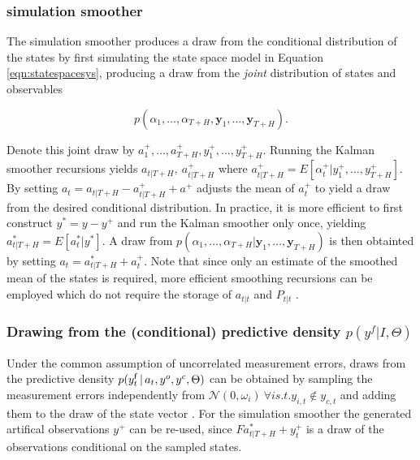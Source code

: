 \documentclass[notitlepage,a4paper,12pt]{article}
\begin{document}
\begin{ThreePartTable}
 \subsubsection*{\citet{durbinkoopman2002_biomtr} simulation smoother}

The \citet{durbinkoopman2002_biomtr} simulation smoother produces a draw from the conditional distribution of the states by first simulating the state space model in Equation \ref{eqn:statespacesys}, producing a draw from the \textit{joint} distribution of states and observables

$$p(\alpha_{1}, \dots, \alpha_{T+H}, \mathbf{y}_1, \dots, \mathbf{y}_{T+H}).$$

Denote this joint draw by $a^+_1, \dots, a^+_{T+H}, y^+_1, \dots, y^+_{T+H}$. Running the Kalman smoother recursions yields $a_{t|T+H}, \: a^+_{t|T+H}$ where $a^+_{t|T+H} = E[\alpha^+_t|y^+_1, \dots, y^+_{T+H}]$.  By setting $a_t = a_{t|T+H} - a^+_{t|T+H} + a^+$ adjusts the mean of $a^+_t$ to yield a draw from the desired conditional distribution. In practice, it is more efficient to first construct $y^* = y-y^+$ and run the Kalman smoother only once, yielding $a^*_{t|T+H} = E[a^*_t|y^*]$. A draw from $p(\alpha_{1}, \dots, \alpha_{T+H}|\mathbf{y}_1, \dots, \mathbf{y}_{T+H})$ is then obtainted by setting $a_t = a^*_{t|T+H} + a^+_t$. Note that since only an estimate of the smoothed mean of the states is required, more efficient smoothing recursions can be employed which do not require the storage of $a_{t|t}$ and $P_{t|t}$ \citep[see][ch. 4.4.2]{durbinkoopman2002_biomtr}.

\subsubsection*{Drawing from the (conditional) predictive density $p(y^f|I, \Theta)$}
Under the common assumption of uncorrelated measurement errors, draws from the predictive density $p(y^{\sf{f}}_t\,|\,a_t, y^o, y^c, \Theta)$ can  be obtained by sampling the measurement errors independently from $\mathcal{N}(0, \omega_i) \: \forall i s.t. y_{i,t} \notin y_{c,t}$ and adding them to the draw of the state vector \citep[see][for the general case of a full covariance matrix $\Omega$]{bgl_2015ijf}. For the \citet{durbinkoopman2002_biomtr} simulation smoother the generated artifical observations $y^+$ can be re-used, since $F a^*_{t|T+H} + y^+_t$ is a draw of the observations conditional on the sampled states.


\end{ThreePartTable}
\end{document}
